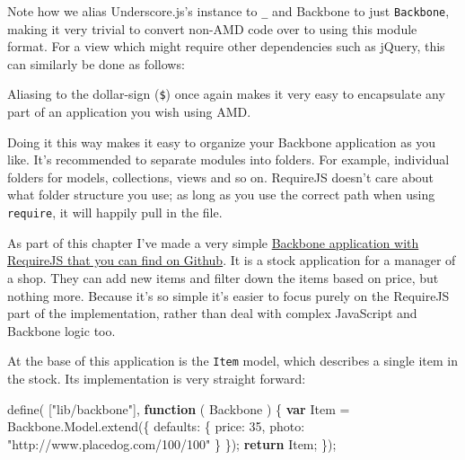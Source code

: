\documentclass[9pt]{book}
\newenvironment{Shaded}{}{}
\newcommand{\KeywordTok}[1]{\textcolor[rgb]{0.00,0.44,0.13}{\textbf{{#1}}}}
\newcommand{\DataTypeTok}[1]{\textcolor[rgb]{0.56,0.13,0.00}{{#1}}}
\newcommand{\DecValTok}[1]{\textcolor[rgb]{0.25,0.63,0.44}{{#1}}}
\newcommand{\StringTok}[1]{\textcolor[rgb]{0.25,0.44,0.63}{{#1}}}
\newcommand{\OtherTok}[1]{\textcolor[rgb]{0.00,0.44,0.13}{{#1}}}
\newcommand{\FunctionTok}[1]{\textcolor[rgb]{0.02,0.16,0.49}{{#1}}}
\newcommand{\NormalTok}[1]{{#1}}
\begin{document}
Note how we alias Underscore.js's instance to \texttt{\_} and Backbone
to just \texttt{Backbone}, making it very trivial to convert non-AMD
code over to using this module format. For a view which might require
other dependencies such as jQuery, this can similarly be done as
follows:

\begin{Shaded}
\end{Shaded}

Aliasing to the dollar-sign (\texttt{\$}) once again makes it very easy
to encapsulate any part of an application you wish using AMD.

Doing it this way makes it easy to organize your Backbone application as
you like. It's recommended to separate modules into folders. For
example, individual folders for models, collections, views and so on.
RequireJS doesn't care about what folder structure you use; as long as
you use the correct path when using \texttt{require}, it will happily
pull in the file.

As part of this chapter I've made a very simple
\href{https://github.com/javascript-playground/backbone-require-example}{Backbone
application with RequireJS that you can find on Github}. It is a stock
application for a manager of a shop. They can add new items and filter
down the items based on price, but nothing more. Because it's so simple
it's easier to focus purely on the RequireJS part of the implementation,
rather than deal with complex JavaScript and Backbone logic too.

At the base of this application is the \texttt{Item} model, which
describes a single item in the stock. Its implementation is very
straight forward:

\begin{Shaded}
\begin{Highlighting}[]
\FunctionTok{define}\NormalTok{( [}\StringTok{"lib/backbone"}\NormalTok{], }\KeywordTok{function} \NormalTok{( Backbone ) \{}
  \KeywordTok{var} \NormalTok{Item = }\OtherTok{Backbone}\NormalTok{.}\OtherTok{Model}\NormalTok{.}\FunctionTok{extend}\NormalTok{(\{}
    \DataTypeTok{defaults}\NormalTok{: \{}
      \DataTypeTok{price}\NormalTok{: }\DecValTok{35}\NormalTok{,}
      \DataTypeTok{photo}\NormalTok{: }\StringTok{"http://www.placedog.com/100/100"}
    \NormalTok{\}}
  \NormalTok{\});}
  \KeywordTok{return} \NormalTok{Item;}
\NormalTok{\});}
\end{Highlighting}
\end{Shaded}
\end{document}
